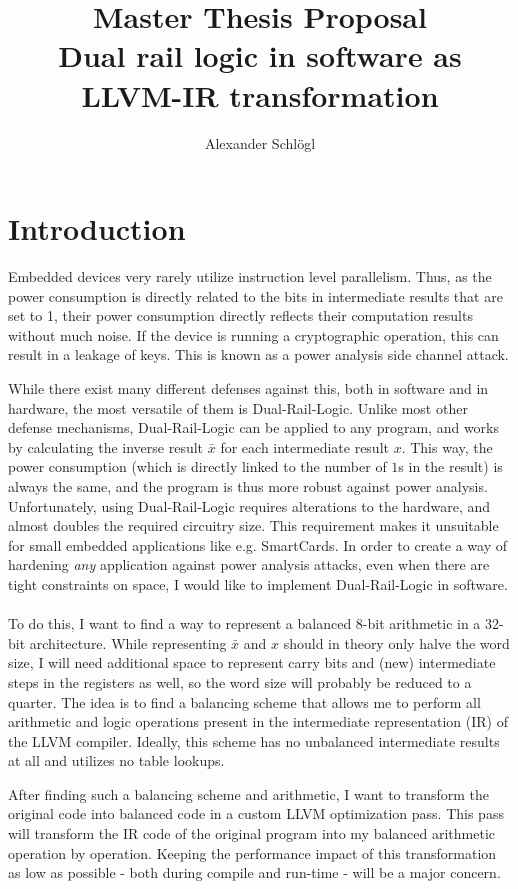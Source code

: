 \documentclass{article}
\title{%
  Master Thesis Proposal\\
  \large Dual rail logic in software as LLVM-IR transformation}
\author{Alexander Schl\"ogl}
\newcommand{\dual}{Dual-Rail-Logic}
\newcommand{\llvm}{LLVM}
\begin{document}
\maketitle

\section{Introduction}
Embedded devices very rarely utilize instruction level parallelism.
Thus, as the power consumption is directly related to the bits in intermediate results that are set to 1, their power consumption directly reflects their computation results without much noise.
If the device is running a cryptographic operation, this can result in a leakage of keys.
This is known as a power analysis side channel attack\cite{kocher1999differential}.

While there exist many different defenses against this, both in software and in hardware, the most versatile of them is \dual{}\cite{sokolov2005design}.
Unlike most other defense mechanisms, \dual{} can be applied to any program, and works by calculating the inverse result $\bar{x}$ for each intermediate result $x$.
This way, the power consumption (which is directly linked to the number of $1$s in the result) is always the same, and the program is thus more robust against power analysis.
Unfortunately, using \dual{} requires alterations to the hardware, and almost doubles the required circuitry size.
This requirement makes it unsuitable for small embedded applications like e.g. SmartCards.
In order to create a way of hardening \emph{any} application against power analysis attacks, even when there are tight constraints on space, I would like to implement \dual{} in software.
\\
\\
To do this, I want to find a way to represent a balanced 8-bit arithmetic in a 32-bit architecture.
While representing $\bar{x}$ and $x$ should in theory only halve the word size, I will need additional space to represent carry bits and (new) intermediate steps in the registers as well, so the word size will probably be reduced to a quarter.
The idea is to find a balancing scheme that allows me to perform all arithmetic and logic operations present in the intermediate representation (IR) of the \llvm{} compiler.
Ideally, this scheme has no unbalanced intermediate results at all and utilizes no table lookups.

After finding such a balancing scheme and arithmetic, I want to transform the original code into balanced code in a custom \llvm{} optimization pass.
This pass will transform the IR code of the original program into my balanced arithmetic operation by operation.
Keeping the performance impact of this transformation as low as possible - both during compile and run-time - will be a major concern.
\end{document}
